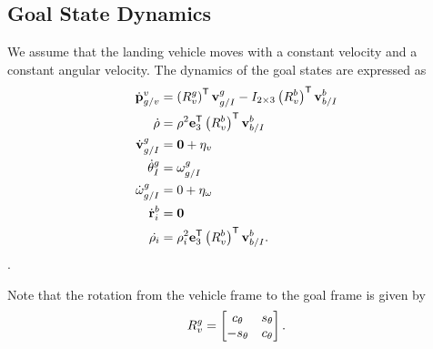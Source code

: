\documentclass[a4paper]{article}
\begin{document}
\subsection{Goal State Dynamics}
We assume that the landing vehicle moves with a constant velocity and a constant
angular velocity. The dynamics of the goal states are expressed as
\begin{align}
  \dot{\boldsymbol{\mathrm{p}}}_{g/v}^{v} &= \left(R_{v}^{g}\right)^{\mathsf{T}}
  \boldsymbol{\mathrm{v}}_{g/I}^{g} - I_{2 \times 3}\left(R_{v}^{b}\right)^{\mathsf{T}} \boldsymbol{\mathrm{v}}_{b/I}^{b} \\
  \dot{\rho} &= \rho^{2} \boldsymbol{\mathrm{e}}_{3}^{\mathsf{T}} \left(R_{v}^{b}\right)^{\mathsf{T}} \boldsymbol{\mathrm{v}}_{b/I}^{b} \\
  \dot{\boldsymbol{\mathrm{v}}}_{g/I}^{g} &= \boldsymbol{\mathrm{0}} + \eta_{v} \\
  \dot{\theta}_{I}^{g} &= \omega_{g/I}^g \\
  \dot{\omega}_{g/I}^{g} &= 0 + \eta_{\omega} \\
  \dot{\boldsymbol{\mathrm{r}}}_{i}^{b} &= \boldsymbol{\mathrm{0}} \\
  \dot{\rho_i} &= \rho_i^{2} \boldsymbol{\mathrm{e}}_{3}^{\mathsf{T}}
    \left(R_{v}^{b}\right)^{\mathsf{T}} \boldsymbol{\mathrm{v}}_{b/I}^{b}.
\end{align}.

Note that the rotation from the vehicle frame to the goal frame is given by
\begin{equation}
  R_v^g =
  \begin{bmatrix}
    c_\theta & s_\theta \\
    -s_\theta & c_\theta
  \end{bmatrix}.
\end{equation}




\end{document}
